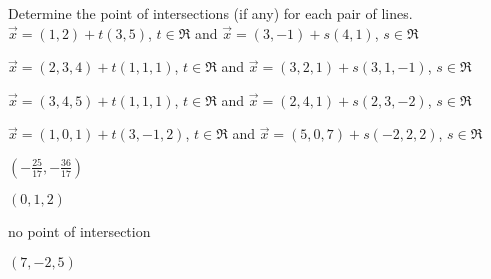 
\begin{Exercise}[
name={},
title={}, 
difficulty=0,
origin={\cite{SM}}]
Determine the point of intersections (if any) for each pair of lines.
\Question $\vec{x} = (1,2) + t(3,5)$, $t\in\Re$ and $\vec{x} = (3,-1)+s(4,1)$, $s\in\Re$

\Question $\vec{x} = (2,3,4) + t(1,1,1)$, $t\in\Re$ and $\vec{x} = (3,2,1) + s(3,1,-1)$, $s\in\Re$

\Question $\vec{x} = (3,4,5) + t(1,1,1)$, $t\in\Re$ and $\vec{x} = (2,4,1) + s(2,3,-2)$, $s\in\Re$

\Question $\vec{x} = (1,0,1) + t(3,-1,2)$, $t\in\Re$ and $\vec{x} = (5,0,7) + s(-2,2,2)$, $s\in\Re$
\end{Exercise}

\begin{Answer}
\Question $\left(-\frac{25}{17},-\frac{36}{17}\right)$

\Question $(0,1,2)$

\Question no point of intersection

\Question $(7,-2,5)$
\end{Answer}
